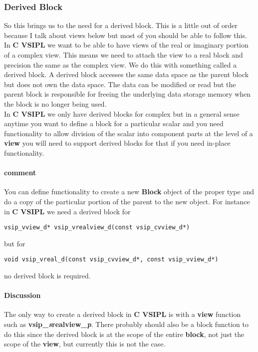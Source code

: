 \documentclass[11pt, oneside]{article}
\newcommand{\cvl}{\ttbf{C VSIPL}}
\newcommand{\ttbf}[1]{{\ttfamily \bfseries #1}}
\newcommand{\Blk}{\ttbf{Block}}
\newcommand{\blk}{\ttbf{block}}
\newcommand{\vw}{\ttbf{view}}
\begin{document}
\subsubsection{Derived Block}
So this brings us to the need for a derived block.  This is a little out of order because I talk about views below but most of you should be able to follow this. 
\\[6pt]
In \cvl{} we want to be able to have views of the real or imaginary portion of a complex view.  This means we need to attach the view to a real block and precision the same as the complex view.  We do this with something called a derived block.  A derived block accesses the same data space as the parent block but does not own the data space. The data can be modified or read but the parent block is responsible for freeing the underlying data storage memory when the block is no longer being used.
\\[6pt]
In \cvl{} we only have derived blocks for complex but in a general sense anytime you want to define a block for a particular scalar and you need functionality to allow division of the scalar into component parts at the level of a \vw{} you will need to support derived blocks for that if you need in-place functionality. 
\paragraph{comment}
You can define functionality to create a new \Blk{} object of the proper type and do a copy of the particular portion of the parent to the new object. For instance in \cvl{} we need a derived block for
\begin{verbatim}
vsip_vview_d* vsip_vrealview_d(const vsip_cvview_d*)
\end{verbatim}
but for 
\begin{verbatim}
void vsip_vreal_d(const vsip_cvview_d*, const vsip_vview_d*)
\end{verbatim}
no derived block is required.  
\paragraph{Discussion}
The only way to create a derived block in \cvl{} is with a \vw{} function such as \ttbf{vsip\_\emph{s}realview\_\emph{p}}. There probably should also be a block function to do this since the derived block is at the scope of the entire \blk{}, not just the scope of the \vw{}, but currently this is not the case.
\end{document}
